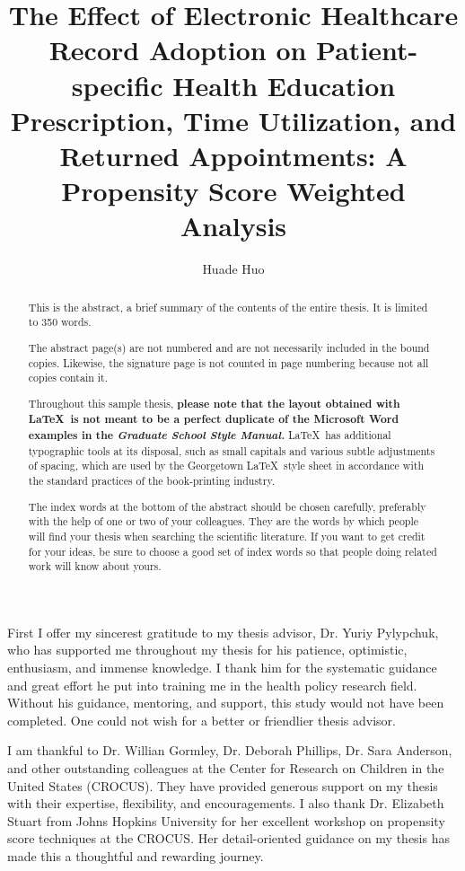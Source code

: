 \documentclass[12pt]{report}
\title{The Effect of Electronic Healthcare Record Adoption
on Patient-specific Health Education Prescription, Time Utilization, and Returned Appointments: A Propensity Score Weighted Analysis}
\author{Huade Huo}
\begin{document}

\maketitle    %

\begin{abstract}
This is the abstract, a brief summary of the contents of the entire thesis.
It is limited to 350 words.

The abstract page(s) are not numbered and are not necessarily included
in the bound copies.  Likewise, the signature page is not counted in
page numbering because not all copies contain it.

Throughout this sample thesis, {\bf please note
that the layout obtained with \LaTeX\ is not meant to be a
perfect duplicate of the Microsoft Word examples in the \emph{Graduate
School Style Manual.}}  \LaTeX\ has additional typographic tools at its
disposal, such as {\sc small capitals} and various subtle adjustments
of spacing, which are used by the Georgetown \LaTeX\ style sheet in
accordance with the standard practices of the book-printing industry.

The index words at the bottom of the abstract should be chosen carefully,
preferably with the help of one or two of your colleagues.
They are the words by which people will find your thesis when searching
the scientific literature.
If you want to get credit for your ideas, be sure to choose a good set of
index words so that people doing related work will know about yours.
\end{abstract}


First I offer my sincerest gratitude to my thesis advisor, Dr. Yuriy Pylypchuk, who has supported me throughout my thesis for his patience, optimistic, enthusiasm, and immense knowledge. I thank him for the systematic guidance and great effort he put into training me in the health policy research field. Without his guidance, mentoring, and support, this study would not have been completed. One could not wish for a better or friendlier thesis advisor.

I am thankful to Dr. Willian Gormley, Dr. Deborah Phillips, Dr. Sara Anderson, and other outstanding colleagues at the Center for Research on Children in the United States (CROCUS). They have provided generous support on my thesis with their expertise, flexibility, and encouragements. I also thank Dr. Elizabeth Stuart from Johns Hopkins University for her excellent workshop on propensity score techniques at the CROCUS. Her detail-oriented guidance on my thesis has made this a thoughtful and rewarding journey.
\end{document}

